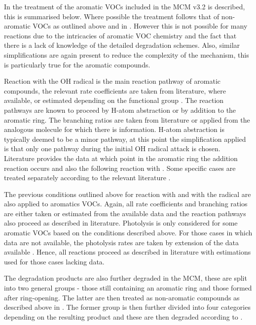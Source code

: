 In \citep{Jenkin:2003} the treatment of the aromatic VOCs included in the MCM v3.2 is described, this is summarised below. Where
possible the treatment follows that of non-aromatic VOCs as outlined above and in \citep{Saunders:2003}. However this is not 
possible for many reactions due to the intricacies of aromatic VOC chemistry and the fact that there is a lack of knowledge of 
the detailed degradation schemes. Also, similar simplifications are again present to reduce the complexity of the mechanism, 
this is particularly true for the  aromatic compounds.

Reaction with the OH radical is the main reaction pathway of aromatic compounds, the relevant rate coefficients are taken from 
literature, where available, or estimated depending on the functional group \citep{Jenkin:2003}. The reaction pathways are known
to proceed by H-atom abstraction or by addition to the aromatic ring. The branching ratios are taken from literature or applied
from the analogous molecule for which there is information. H-atom abstraction is typically deemed to be a minor pathway, at 
this point the simplification applied is that only one pathway during the initial OH radical attack is chosen. Literature 
provides the data at which point in the aromatic ring the addition reaction occurs and also the following reaction with 
. Some specific cases are treated separately according to the relevant literature \citep{Jenkin:2003}.

The previous conditions outlined above for reaction with  and with the  radical are also applied to aromatics 
VOCs. Again, all rate coefficients and branching ratios are either taken or estimated from the available data and the reaction 
pathways also proceed as described in literature. Photolysis is only considered for some aromatic VOCs based on the conditions 
described above. For those cases in which data are not available, the photolysis rates are taken by extension of the data 
available \citep{Jenkin:2003}. Hence, all reactions proceed as described in literature with estimations used for those cases 
lacking data.

The degradation products are also further degraded in the MCM, these are split into two general groups - those still containing
an aromatic ring and those formed after ring-opening. The latter are then treated as non-aromatic compounds as described above 
in \citep{Saunders:2003}. The former group is then further divided into four categories depending on the resulting product and 
these are then degraded according to \citep{Jenkin:2003}.

